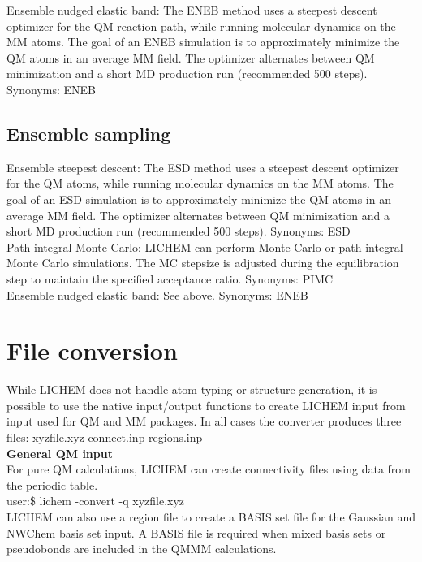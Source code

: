 \documentclass[12pt]{report}
\begin{document}
Ensemble nudged elastic band: The ENEB method uses a steepest descent
optimizer \cite{} for the QM reaction path, while running molecular
dynamics on the MM atoms.
The goal of an ENEB simulation is to approximately minimize the QM atoms
in an average MM field.
The optimizer alternates between QM minimization and a short MD production
run (recommended 500 steps).
Synonyms: ENEB

\subsection{Ensemble sampling}

Ensemble steepest descent: The ESD method uses a steepest descent
optimizer \cite{} for the QM atoms, while running molecular
dynamics on the MM atoms.
The goal of an ESD simulation is to approximately minimize the QM atoms
in an average MM field.
The optimizer alternates between QM minimization and a short MD production
run (recommended 500 steps).
Synonyms: ESD \\

Path-integral Monte Carlo: LICHEM can perform Monte Carlo or path-integral
Monte Carlo simulations.
The MC stepsize is adjusted during the equilibration step to maintain the
specified acceptance ratio.
Synonyms: PIMC \\

Ensemble nudged elastic band: See above.
Synonyms: ENEB

\section{File conversion}

While LICHEM does not handle atom typing or structure generation, it is
possible to use the native input/output functions to create LICHEM input from
input used for QM and MM packages.
In all cases the converter produces three files: xyzfile.xyz connect.inp
regions.inp \\

{\textbf{General QM input}} \\

For pure QM calculations, LICHEM can create connectivity files using data
from the periodic table. \\

user:\$ lichem -convert -q xyzfile.xyz \\

LICHEM can also use a region file to create a BASIS set file for the Gaussian
and NWChem basis set input.
A BASIS file is required when mixed basis sets or pseudobonds are included
in the QMMM calculations. \\
\end{document}
